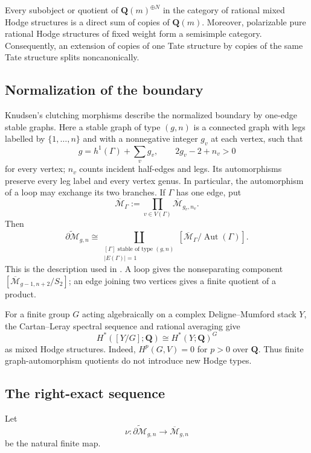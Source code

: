 \documentclass[12pt,reqno]{amsart}
\newcommand{\Q}{\mathbf{Q}}
\newcommand{\M}{\mathcal{M}}
\newcommand{\Mbar}{\overline{\mathcal{M}}}
\newcommand{\Aut}{\operatorname{Aut}}
\theoremstyle{definition}
\theoremstyle{remark}
\begin{document}
Every subobject or quotient of $\Q(m)^{\oplus N}$ in the category of
rational mixed Hodge structures is a direct sum of copies of $\Q(m)$.
Moreover, polarizable pure rational Hodge structures of fixed weight form a
semisimple category.  Consequently, an extension of copies of one Tate
structure by copies of the same Tate structure splits noncanonically.

\subsection{Normalization of the boundary}

Knudsen's clutching morphisms \cite{Knudsen} describe the normalized
boundary by one-edge stable graphs.  Here a stable graph of type $(g,n)$ is
a connected graph with legs labelled by $\{1,\ldots,n\}$ and with a
nonnegative integer $g_v$ at each vertex, such that
\[
 g=h^1(\Gamma)+\sum_v g_v,
 \qquad 2g_v-2+n_v>0
\]
for every vertex; $n_v$ counts incident half-edges and legs.  Its
automorphisms preserve every leg label and every vertex genus.  In
particular, the automorphism of a loop may exchange its two branches.
If $\Gamma$ has one edge, put
\[
 \Mbar_\Gamma:=\prod_{v\in V(\Gamma)}\Mbar_{g_v,n_v}.
\]
Then
\begin{equation}\label{eq:boundary-graphs}
 \widetilde{\partial\M}_{g,n}
 \cong
 \coprod_{\substack{[\Gamma]\text{ stable of type }(g,n)\\
                     |E(\Gamma)|=1}}
 \left[\Mbar_\Gamma/\Aut(\Gamma)\right].
\end{equation}
This is the description used in \cite[Section~2.1]{CLP}.  A loop gives the
nonseparating component $[\Mbar_{g-1,n+2}/S_2]$; an edge joining two
vertices gives a finite quotient of a product.

For a finite group $G$ acting algebraically on a complex Deligne--Mumford
stack $Y$, the Cartan--Leray spectral sequence and rational averaging give
\begin{equation}\label{eq:quotient-invariants}
 H^*([Y/G];\Q)\cong H^*(Y;\Q)^G
\end{equation}
as mixed Hodge structures.  Indeed, $H^p(G,V)=0$ for $p>0$ over $\Q$.
Thus finite graph-automorphism quotients do not introduce new Hodge types.

\subsection{The right-exact sequence}

Let
\[
 \nu\colon\widetilde{\partial\M}_{g,n}\longrightarrow\Mbar_{g,n}
\]
be the natural finite map.
\end{document}
